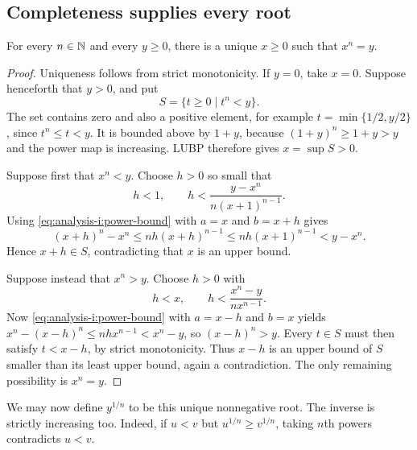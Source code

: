 \subsection{Completeness supplies every root}
\begin{theorem}
  \label{thm:analysis-i:positive-roots}
  For every $n\in\mathbb{N}$ and every $y\geq0$, there is a unique $x\geq0$
  such that $x^n=y$.
\end{theorem}
\begin{marginfigure}
  \centering
  
  \caption[A square of prescribed area.]{The square $[0,s]\times[0,s]$ in
    $\R^2$ has area $A=s^2$. Every $A\geq0$ determines a unique
    nonnegative side length.}
  \label{fig:analysis-i:root-square}
\end{marginfigure}
\begin{marginfigure}
  \centering
  
  \caption[A cube of prescribed volume.]{The cube
    $[0,s]\times[0,s]\times[0,s]$ in $\R^3$ has volume $V=s^3$.
    Every $V\geq0$ determines a unique nonnegative side length.}
  \label{fig:analysis-i:root-cube}
\end{marginfigure}
\begin{proof}
  Uniqueness follows from strict monotonicity. If $y=0$, take $x=0$.
  Suppose henceforth that $y>0$, and put
  \[
    S=\{t\geq0\mid t^n<y\}.
  \]
  The set contains zero and also a positive element, for example
  $t=\min\{1/2,y/2\}$, since $t^n\leq t<y$.
  It is bounded above by $1+y$, because
  $(1+y)^n\geq1+y>y$ and the power map is increasing.
  LUBP therefore gives $x=\sup S>0$.

  Suppose first that $x^n<y$. Choose $h>0$ so small that
  \[
    h<1,\qquad h<\frac{y-x^n}{n(x+1)^{n-1}}.
  \]
  Using \autoref{eq:analysis-i:power-bound} with $a=x$ and $b=x+h$
  gives
  \[
    (x+h)^n-x^n\leq nh(x+h)^{n-1}
      \leq nh(x+1)^{n-1}<y-x^n.
  \]
  Hence $x+h\in S$, contradicting that $x$ is an upper bound.

  Suppose instead that $x^n>y$. Choose $h>0$ with
  \[
    h<x,\qquad h<\frac{x^n-y}{nx^{n-1}}.
  \]
  Now \autoref{eq:analysis-i:power-bound} with $a=x-h$ and $b=x$
  yields $x^n-(x-h)^n\leq nhx^{n-1}<x^n-y$, so $(x-h)^n>y$.
  Every $t\in S$ must then satisfy $t<x-h$, by strict monotonicity.
  Thus $x-h$ is an upper bound of $S$ smaller than its least upper bound,
  again a contradiction. The only remaining possibility is $x^n=y$.
\end{proof}
We may now define $y^{1/n}$ to be this unique nonnegative root. The inverse
is strictly increasing too. Indeed, if $u<v$ but $u^{1/n}\geq v^{1/n}$,
taking $n$th powers contradicts $u<v$.

